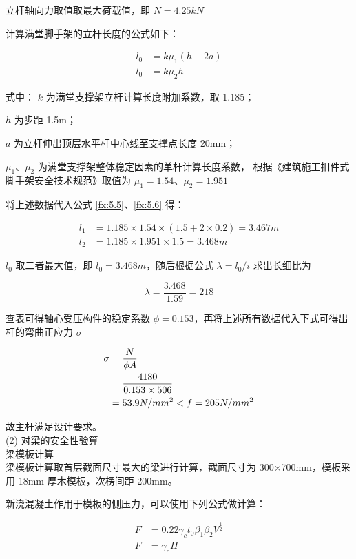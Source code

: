 立杆轴向力取值取最大荷载值，即 $N=4.25 kN$

计算满堂脚手架的立杆长度的公式如下：

\begin{align}
\label{fx:5.5}
l_0&=k\mu_1(h+2a)\\
\label{fx:5.6}
l_0&=k\mu_2h
\end{align}

式中：
$k$ 为满堂支撑架立杆计算长度附加系数，取 1.185；   

$h$ 为步距 1.5m；                           

$a$ 为立杆伸出顶层水平杆中心线至支撑点长度 20mm；

$\mu_1$、$\mu_2$ 为满堂支撑架整体稳定因素的单杆计算长度系数，
根据《建筑施工扣件式脚手架安全技术规范》取值为 $\mu_1=1.54$、$\mu_2=1.951$

将上述数据代入公式 \ref{fx:5.5}、\ref{fx:5.6} 得：

\begin{align*}
    l_1&=1.185\times 1.54\times (1.5+2\times 0.2)=3.467 m\\
    l_2&=1.185\times 1.951\times 1.5=3.468 m
\end{align*}

$l_0$ 取二者最大值，即 $l_0=3.468 m$，随后根据公式 $\lambda=l_0/i$ 求出长细比为

\[
    \lambda = \frac{3.468}{1.59}=218
\]

查表可得轴心受压构件的稳定系数 $\phi =0.153$，再将上述所有数据代入下式可得出杆的弯曲正应力 $\sigma $

\begin{align}
\sigma &=\frac{N}{\phi A}\\
&=\frac{4180}{0.153\times 506} \notag\\
&=53.9 N/mm^2<f=205 N/mm^2 \notag
\end{align}

故主杆满足设计要求。\\

(2) 对梁的安全性验算\\

 梁模板计算\\

梁模板计算取首层截面尺寸最大的梁进行计算，截面尺寸为 300×700mm，模板采用 18mm
厚木模板，次楞间距 200mm。

新浇混凝土作用于模板的侧压力，可以使用下列公式做计算：

\begin{align}
    \label{fx:5.7}
    F&=0.22\gamma_c t_0\beta_1 \beta_2V^{\frac{1}{2}}\\
    \label{fx:5.7a}
    F&=\gamma_c H
\end{align}

